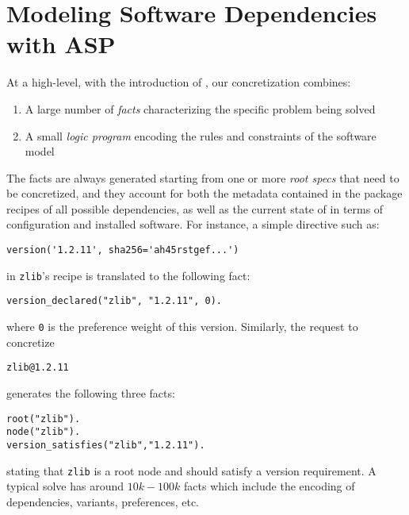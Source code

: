 \section{Modeling Software Dependencies with ASP}
\label{sec:asp-model}

At a high-level, with the introduction of \clingo, our concretization
combines:
\begin{enumerate}
\item A large number of \emph{facts} characterizing the specific problem being solved
\item A small \emph{logic program} encoding the rules and constraints of the software model
\end{enumerate}
The facts are always generated starting from one or more \emph{root specs} that need to
be concretized, and they account for both the metadata contained in the package recipes
of all possible dependencies, as well as the current state of \spack{} in terms of
configuration and installed software. For instance, a simple directive such as:

\begin{verbatim}
version('1.2.11', sha256='ah45rstgef...')
\end{verbatim}

in \texttt{zlib}'s recipe is translated to the following fact:

\begin{verbatim}
version_declared("zlib", "1.2.11", 0).
\end{verbatim}

where {\tt 0} is the preference weight of this version. Similarly, the request to
concretize

\begin{verbatim}
zlib@1.2.11
\end{verbatim}

generates the following three facts:

\begin{verbatim}
root("zlib").
node("zlib").
version_satisfies("zlib","1.2.11").
\end{verbatim}

stating that \texttt{zlib} is a root node and should satisfy
a version requirement.
A typical solve has around $10k-100k$ facts which include
the encoding of dependencies, variants, preferences, etc.

